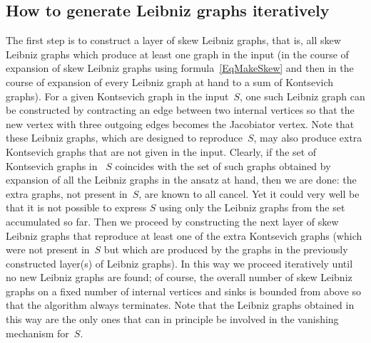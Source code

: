 \documentclass[a4paper]{jpconf}%
\theoremstyle{definition}
\theoremstyle{remark}
\begin{document}
\subsection{How to generate Leibniz graphs iteratively}\label{SecGenLeibnizIteratively}
The first step is to construct a %
layer of skew Leibniz graphs, 
that is, all skew Leibniz graphs which produce at least one graph in the input
(in the course of expansion of skew Leibniz graphs using formula~\eqref{EqMakeSkew} and then
in the course of expansion of every Leibniz graph at hand to a sum of Kontsevich graphs).
For a given Kontsevich graph in the input~$S$, one such Leibniz graph can be constructed 
by contracting an edge between two internal vertices %
so that the new vertex with three outgoing edges becomes %
the Jacobiator vertex. 
Note that these Leibniz graphs, which are designed to reproduce~$S$,
may also produce extra Kontsevich graphs that are not given in the input.
Clearly, if the set of Kontsevich graphs in~%
$S$ coincides with the set of such graphs obtained by expansion of all the Leibniz graphs
in the ansatz at hand, then we are done: the extra graphs, not present in~$S$, are known to all cancel.
Yet it could very well be that it is not possible to express $S$ using only the Leibniz graphs 
from the set accumulated so far. %
Then we %
proceed by constructing the next %
layer of skew Leibniz graphs that reproduce at least one of the extra Kontsevich graphs 
(which were not present in~$S$ but which are produced by the graphs in the previously constructed layer(s) 
of Leibniz graphs).
In this way we %
proceed iteratively until no new Leibniz graphs are found;
of course, the overall number of skew Leibniz graphs on a fixed number of internal vertices and sinks 
is bounded from above so that the algorithm always terminates.
Note that the Leibniz graphs %
obtained in this way are the only ones that can in principle be involved in the vanishing mechanism for~$S$.


\end{document}
